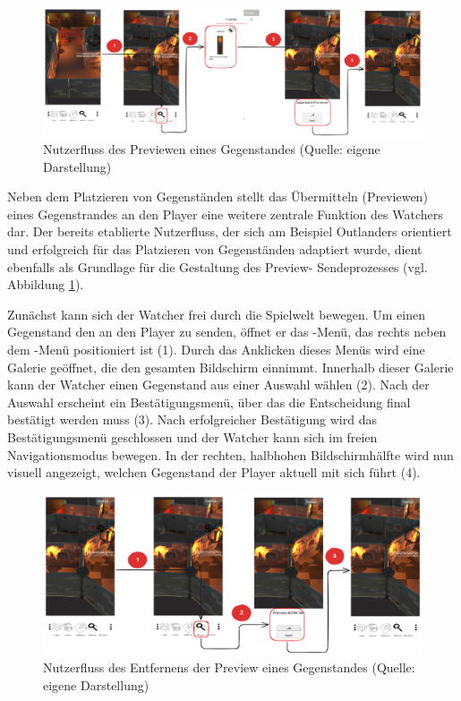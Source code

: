 \begin{figure}[ht]
\centering
\includegraphics[width=1\linewidth]{content/pictures/PreviewFlow.png}
\caption{Nutzerfluss des Previewen eines Gegenstandes (Quelle: eigene Darstellung)}
\label{fig:userflow-preview-cm}
\end{figure}

Neben dem Platzieren von Gegenständen stellt das Übermitteln (Previewen) eines Gegenstrandes an den Player eine weitere zentrale Funktion des Watchers dar. Der bereits etablierte Nutzerfluss, der sich am Beispiel Outlanders orientiert und erfolgreich für das Platzieren von Gegenständen adaptiert wurde, dient ebenfalls als Grundlage für die Gestaltung des Preview- Sendeprozesses (vgl. Abbildung \ref{fig:userflow-preview-cm}).

Zunächst kann sich der Watcher frei durch die Spielwelt bewegen. Um einen Gegenstand den an den Player zu senden, öffnet er das -Menü, das rechts neben dem -Menü positioniert ist (1). Durch das Anklicken dieses Menüs wird eine Galerie geöffnet, die den gesamten Bildschirm einnimmt. Innerhalb dieser Galerie kann der Watcher einen Gegenstand aus einer Auswahl wählen (2). Nach der Auswahl erscheint ein Bestätigungsmenü, über das die Entscheidung final bestätigt werden muss (3). Nach erfolgreicher Bestätigung wird das Bestätigungsmenü geschlossen und der Watcher kann sich im freien Navigationsmodus bewegen. In der rechten, halbhohen Bildschirmhälfte wird nun visuell angezeigt, welchen Gegenstand der Player aktuell mit sich führt (4).

\begin{figure}[ht]
\centering
\includegraphics[width=1\linewidth]{content/pictures/RemovePreviewFlow.png}
\caption{Nutzerfluss des Entfernens der Preview eines Gegenstandes (Quelle: eigene Darstellung)}
\label{fig:userflow-remove-preview-cm}
\end{figure}

